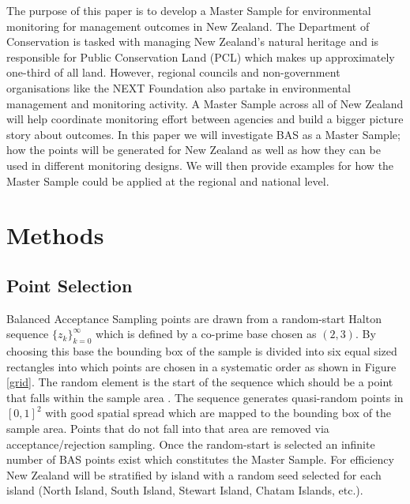 \documentclass[]{article}
\begin{document}
The purpose of this paper is to develop a Master Sample for environmental monitoring for management outcomes in New Zealand. The Department of Conservation is tasked with managing New Zealand's natural heritage and is responsible for Public Conservation Land (PCL) which makes up approximately one-third of all land. However, regional councils and non-government organisations like the NEXT Foundation also partake in environmental management and monitoring activity. A Master Sample across all of New Zealand will help coordinate monitoring effort between agencies and build a bigger picture story about outcomes. In this paper we will investigate BAS as a Master Sample; how the points will be generated for New Zealand as well as how they can be used in different monitoring designs. We will then provide examples for how the Master Sample could be applied at the regional and national level.\\

\section{Methods}
\subsection{Point Selection}
Balanced Acceptance Sampling points are drawn from a random-start Halton sequence $\{z_k\}_{k=0}^{\infty}$ which is defined by a co-prime base chosen as $(2,3)$. By choosing this base the bounding box of the sample is divided into six equal sized rectangles into which points are chosen in a systematic order as shown in Figure \ref{grid}. The random element is the start of the sequence which should be a point that falls within the sample area \cite{Robertson2016}. The sequence generates quasi-random points in $[0,1]^2$ with good spatial spread which are mapped to the bounding box of the sample area. Points that do not fall into that area are removed via acceptance/rejection sampling. Once the random-start is selected an infinite number of BAS points exist which constitutes the Master Sample. For efficiency New Zealand will be stratified by island with  a random seed selected for each island (North Island, South Island, Stewart Island, Chatam Islands, etc.).\\
\end{document}
